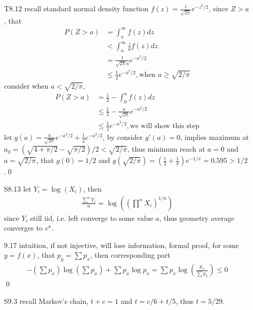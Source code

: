 \documentclass[paper=a4, fontsize=11pt]{scrartcl} %
\numberwithin{equation}{section} %
\numberwithin{figure}{section} %
\numberwithin{table}{section} %
\begin{document}
\begin{itemize}
	\item[T8.12] recall standard normal density function $f(z)= \frac{1}{\sqrt{2\pi}} e^{-z^2/2} $, since $Z>a$, that
	\begin{align}
		P(Z>a) &= \int_a^\infty f(z)dz \\
			&< \int_a^\infty \frac{z}{a} f(z)dz \\
			&= \frac{1}{\sqrt{2\pi} a} e^{-a^2/2}\\
			&\leq \frac{1}{2}e^{-a^2/2}, \text{when } a\geq\sqrt{2/\pi}
	\end{align}
	consider when $a < \sqrt{2/\pi}$,
	\begin{align}
		P(Z>a) &= \frac{1}{2} - \int_0^a f(z)dz \\
			&\leq \frac{1}{2} - \frac{a}{\sqrt{2\pi}} e^{-a^2/2}\\
			&\leq \frac{1}{2}e^{-a^2/2}, \text{we will show this step}
	\end{align}
	let $g(a)= \frac{a}{\sqrt{2\pi}} e^{-a^2/2}+ \frac{1}{2}e^{-a^2/2}$, by consider $g'(a)=0$, implies maximum at $a_0=(\sqrt{4+\pi/2} -\sqrt{\pi/2})/2< \sqrt{2/\pi}$, thus minimum reach at $a=0$ and $a=\sqrt{2/\pi}$, that $g(0)=1/2$ and $g(\sqrt{2/\pi})=(\frac{1}{2}+\frac{1}{\pi})e^{-1/\pi}=0.595>1/2$.\qed
	\item[S8.13] let $Y_i = \log (X_i)$, then 
	\begin{align}
		\frac{\sum^n Y_i}{n} = \log((\prod^n X_i)^{1/n})
	\end{align}
	since $Y_i$ still iid, i.e. left converge to some value $a$, thus geometry average converges to $e^a$.
	\item[9.17] intuition, if not injective, will lose information, formal proof, for some $y=f(x)$, that $p_y =\sum p_x$, then corresponding part
	\begin{align}
		-(\sum p_x)\log (\sum p_x) + \sum p_x\log p_x = \sum p_x\log(\frac{p_x}{\sum p_x})\leq 0
	\end{align}\qed
	\item[S9.3] recall Markov's chain, $t+c=1$ and $t=c/6+t/5$, thus $t=5/29$.
\end{itemize}
\end{document}
